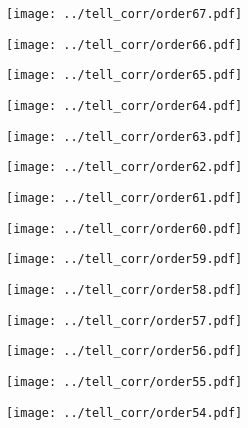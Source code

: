 \documentclass{article}
\begin{document}
\begin{figure}[H]
    \centering
    \texttt{[image: ../tell\_corr/order67.pdf]}
\end{figure}
\begin{figure}[H]
    \centering
    \texttt{[image: ../tell\_corr/order66.pdf]}
\end{figure}
\begin{figure}[H]
    \centering
    \texttt{[image: ../tell\_corr/order65.pdf]}
\end{figure}
\begin{figure}[H]
    \centering
    \texttt{[image: ../tell\_corr/order64.pdf]}
\end{figure}
\begin{figure}[H]
    \centering
    \texttt{[image: ../tell\_corr/order63.pdf]}
\end{figure}
\begin{figure}[H]
    \centering
    \texttt{[image: ../tell\_corr/order62.pdf]}
\end{figure}
\begin{figure}[H]
    \centering
    \texttt{[image: ../tell\_corr/order61.pdf]}
\end{figure}
\begin{figure}[H]
    \centering
    \texttt{[image: ../tell\_corr/order60.pdf]}
\end{figure}
\begin{figure}[H]
    \centering
    \texttt{[image: ../tell\_corr/order59.pdf]}
\end{figure}
\begin{figure}[H]
    \centering
    \texttt{[image: ../tell\_corr/order58.pdf]}
\end{figure}
\begin{figure}[H]
    \centering
    \texttt{[image: ../tell\_corr/order57.pdf]}
\end{figure}
\begin{figure}[H]
    \centering
    \texttt{[image: ../tell\_corr/order56.pdf]}
\end{figure}
\begin{figure}[H]
    \centering
    \texttt{[image: ../tell\_corr/order55.pdf]}
\end{figure}
\begin{figure}[H]
    \centering
    \texttt{[image: ../tell\_corr/order54.pdf]}
\end{figure}
\end{document}
